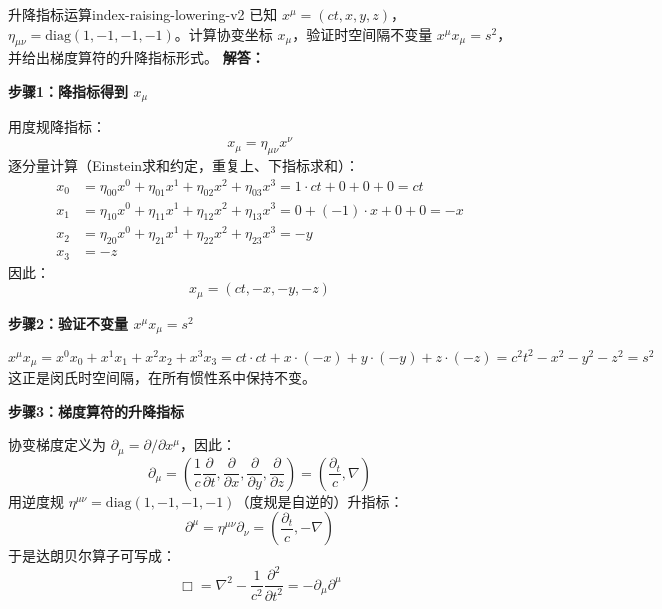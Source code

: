 \documentclass[11pt,a4paper,openany,oneside]{book}
\newcommand{\lap}{\nabla^2}
\newcommand{\difficulty}[1]{\marginnote{\textcolor{red}{\textbf{[#1]}}}}
\begin{document}
\begin{example}{升降指标运算}{index-raising-lowering-v2}
\difficulty{基础}
已知 $x^\mu=(ct,x,y,z)$，$\eta_{\mu\nu}=\mathrm{diag}(1,-1,-1,-1)$。计算协变坐标 $x_\mu$，验证时空间隔不变量 $x^\mu x_\mu=s^2$，并给出梯度算符的升降指标形式。
\tcblower
\textbf{解答：}

\textbf{步骤1：降指标得到 $x_\mu$}

用度规降指标：
\[
x_\mu = \eta_{\mu\nu}x^\nu
\]
逐分量计算（Einstein求和约定，重复上、下指标求和）：
\begin{align*}
x_0 &= \eta_{00}x^0 + \eta_{01}x^1 + \eta_{02}x^2 + \eta_{03}x^3 = 1\cdot ct + 0 + 0 + 0 = ct \\
x_1 &= \eta_{10}x^0 + \eta_{11}x^1 + \eta_{12}x^2 + \eta_{13}x^3 = 0 + (-1)\cdot x + 0 + 0 = -x \\
x_2 &= \eta_{20}x^0 + \eta_{21}x^1 + \eta_{22}x^2 + \eta_{23}x^3 = -y \\
x_3 &= -z
\end{align*}
因此：
\[
x_\mu = (ct, -x, -y, -z)
\]

\textbf{步骤2：验证不变量 $x^\mu x_\mu = s^2$}

\[
x^\mu x_\mu = x^0 x_0 + x^1 x_1 + x^2 x_2 + x^3 x_3 = ct\cdot ct + x\cdot(-x) + y\cdot(-y) + z\cdot(-z) = c^2t^2 - x^2 - y^2 - z^2 = s^2
\]
这正是闵氏时空间隔，在所有惯性系中保持不变。

\textbf{步骤3：梯度算符的升降指标}

协变梯度定义为 $\partial_\mu = \partial/\partial x^\mu$，因此：
\[
\partial_\mu = \left(\frac{1}{c}\frac{\partial}{\partial t}, \frac{\partial}{\partial x}, \frac{\partial}{\partial y}, \frac{\partial}{\partial z}\right) = \left(\frac{\partial_t}{c}, \nabla\right)
\]
用逆度规 $\eta^{\mu\nu}=\mathrm{diag}(1,-1,-1,-1)$（度规是自逆的）升指标：
\[
\partial^\mu = \eta^{\mu\nu}\partial_\nu = \left(\frac{\partial_t}{c}, -\nabla\right)
\]
于是达朗贝尔算子可写成：
\[
\Box = \lap - \frac{1}{c^2}\frac{\partial^2}{\partial t^2} = -\partial_\mu\partial^\mu
\]
\end{example}
\end{document}
